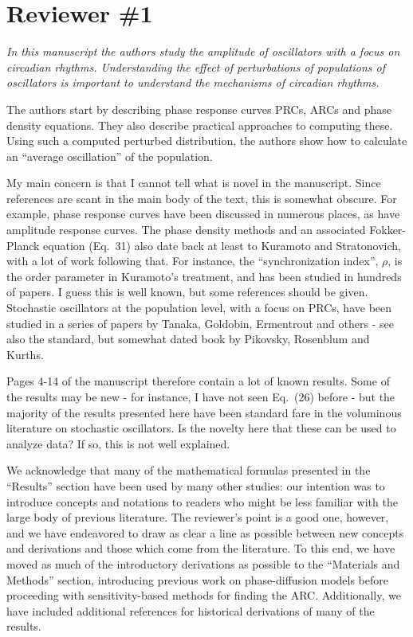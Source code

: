 \documentclass[11pt, letterpaper]{article}
\newenvironment{reviewer}{\itshape\color{gray}}{}
\begin{document}
\section*{Reviewer \#1}
\begin{reviewer}
In this manuscript the authors study the amplitude of oscillators with a focus on circadian rhythms.
Understanding the effect of perturbations of populations of oscillators is important to understand the mechanisms of circadian rhythms.
 
The authors start by describing phase response curves PRCs, ARCs and phase density equations.
They also describe practical approaches to computing these.
Using such a computed perturbed distribution, the authors show how to calculate an ``average oscillation'' of the population.

My main concern is that I cannot tell what is novel in the manuscript.
Since references are scant in the main body of the text, this is somewhat obscure.
For example, phase response curves have been discussed in numerous places, as have amplitude response curves.
The phase density methods and an associated Fokker-Planck equation (Eq.~31) also date back at least to Kuramoto and Stratonovich, with a lot of work following that.
For instance, the ``synchronization index'', $\rho$, is the order parameter in Kuramoto's treatment, and has been studied in hundreds of papers.
I guess this is well known, but some references should be given.
Stochastic oscillators at the population level, with a focus on PRCs, have been studied in a series of papers by Tanaka, Goldobin, Ermentrout and others - see also the standard, but somewhat dated book by Pikovsky, Rosenblum and Kurths.

Pages 4-14 of the manuscript therefore contain a lot of known results.
Some of the results may be new - for instance, I have not seen Eq.~(26) before - but the majority of the results presented here have been standard fare in the voluminous literature on stochastic oscillators.
Is the novelty here that these can be used to analyze data? If so, this is not well explained.
\end{reviewer}

We acknowledge that many of the mathematical formulas presented in the ``Results'' section have been used by many other studies: our intention was to introduce concepts and notations to readers who might be less familiar with the large body of previous literature.
The reviewer's point is a good one, however, and we have endeavored to draw as clear a line as possible between new concepts and derivations and those which come from the literature.
To this end, we have moved as much of the introductory derivations as possible to the ``Materials and Methods'' section, introducing previous work on phase-diffusion models before proceeding with sensitivity-based methods for finding the ARC.
Additionally, we have included additional references for historical derivations of many of the results.
\end{document}
